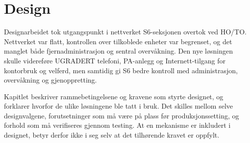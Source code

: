 \begingroup
\captionsetup[table]{justification=centering,singlelinecheck=false}
\section{Design}
Designarbeidet tok utgangspunkt i nettverket S6-seksjonen overtok ved HO/TO. Nettverket var flatt, kontrollen over tilkoblede enheter var begrenset, og det manglet både fjernadministrasjon og sentral overvåkning. Den nye løsningen skulle videreføre UGRADERT telefoni, PA-anlegg og Internett-tilgang for kontorbruk og velferd, men samtidig gi S6 bedre kontroll med administrasjon, overvåkning og gjenoppretting.

Kapitlet beskriver rammebetingelsene og kravene som styrte designet, og forklarer hvorfor de ulike løsningene ble tatt i bruk. Det skilles mellom selve designvalgene, forutsetninger som må være på plass før produksjonssetting, og forhold som må verifiseres gjennom testing. At en mekanisme er inkludert i designet, betyr derfor ikke i seg selv at det tilhørende kravet er oppfylt.

